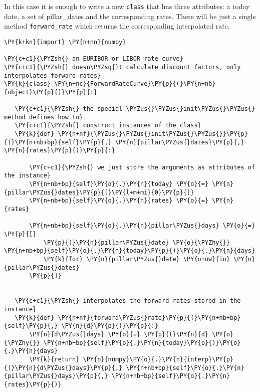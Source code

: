 \begin{Answer}
In this case it is enough to write a new \texttt{class} that has three
attributes: a today date, a set of pillar\_dates and the corresponding
rates. There will be just a single method \texttt{forward\_rate} which
returns the corresponding interpolated rate.

\begin{tcolorbox}[size=fbox, boxrule=1pt, colback=cellbackground, colframe=cellborder]
\begin{Verbatim}[commandchars=\\\{\}]
\PY{k+kn}{import} \PY{n+nn}{numpy}
        
\PY{c+c1}{\PYZsh{} an EURIBOR or LIBOR rate curve}
\PY{c+c1}{\PYZsh{} doesn\PYZsq{}t calculate discount factors, only interpolates forward rates}
\PY{k}{class} \PY{n+nc}{ForwardRateCurve}\PY{p}{(}\PY{n+nb}{object}\PY{p}{)}\PY{p}{:}
   
   \PY{c+c1}{\PYZsh{} the special \PYZus{}\PYZus{}init\PYZus{}\PYZus{} method defines how to}
   \PY{c+c1}{\PYZsh{} construct instances of the class}
   \PY{k}{def} \PY{n+nf}{\PYZus{}\PYZus{}init\PYZus{}\PYZus{}}\PY{p}{(}\PY{n+nb+bp}{self}\PY{p}{,} \PY{n}{pillar\PYZus{}dates}\PY{p}{,} \PY{n}{rates}\PY{p}{)}\PY{p}{:}
       
       \PY{c+c1}{\PYZsh{} we just store the arguments as attributes of the instance}
       \PY{n+nb+bp}{self}\PY{o}{.}\PY{n}{today} \PY{o}{=} \PY{n}{pillar\PYZus{}dates}\PY{p}{[}\PY{l+m+mi}{0}\PY{p}{]}
       \PY{n+nb+bp}{self}\PY{o}{.}\PY{n}{rates} \PY{o}{=} \PY{n}{rates}
       
       \PY{n+nb+bp}{self}\PY{o}{.}\PY{n}{pillar\PYZus{}days} \PY{o}{=} \PY{p}{[}
           \PY{p}{(}\PY{n}{pillar\PYZus{}date} \PY{o}{\PYZhy{}} \PY{n+nb+bp}{self}\PY{o}{.}\PY{n}{today}\PY{p}{)}\PY{o}{.}\PY{n}{days}
           \PY{k}{for} \PY{n}{pillar\PYZus{}date} \PY{o+ow}{in} \PY{n}{pillar\PYZus{}dates}
       \PY{p}{]}
       
       
   \PY{c+c1}{\PYZsh{} interpolates the forward rates stored in the instance}
   \PY{k}{def} \PY{n+nf}{forward\PYZus{}rate}\PY{p}{(}\PY{n+nb+bp}{self}\PY{p}{,} \PY{n}{d}\PY{p}{)}\PY{p}{:}
       \PY{n}{d\PYZus{}days} \PY{o}{=} \PY{p}{(}\PY{n}{d} \PY{o}{\PYZhy{}} \PY{n+nb+bp}{self}\PY{o}{.}\PY{n}{today}\PY{p}{)}\PY{o}{.}\PY{n}{days}
       \PY{k}{return} \PY{n}{numpy}\PY{o}{.}\PY{n}{interp}\PY{p}{(}\PY{n}{d\PYZus{}days}\PY{p}{,} \PY{n+nb+bp}{self}\PY{o}{.}\PY{n}{pillar\PYZus{}days}\PY{p}{,} \PY{n+nb+bp}{self}\PY{o}{.}\PY{n}{rates}\PY{p}{)}
\end{Verbatim}

\end{tcolorbox}
\end{Answer}

